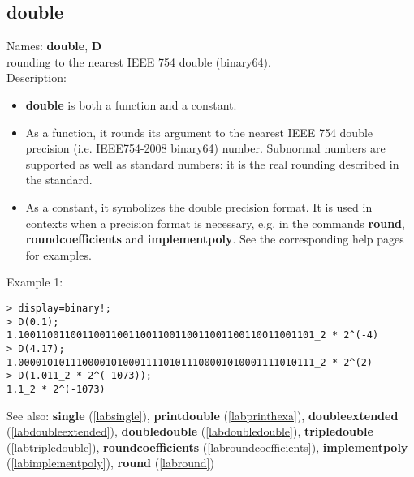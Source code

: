 \subsection{double}
\label{labdouble}
\noindent Names: \textbf{double}, \textbf{D}\\
rounding to the nearest IEEE 754 double (binary64).\\
\noindent Description: \begin{itemize}

\item \textbf{double} is both a function and a constant.

\item As a function, it rounds its argument to the nearest IEEE 754 double precision (i.e. IEEE754-2008 binary64) number.
   Subnormal numbers are supported as well as standard numbers: it is the real
   rounding described in the standard.

\item As a constant, it symbolizes the double precision format. It is used in 
   contexts when a precision format is necessary, e.g. in the commands 
   \textbf{round}, \textbf{roundcoefficients} and \textbf{implementpoly}.
   See the corresponding help pages for examples.
\end{itemize}
\noindent Example 1: 
\begin{center}\begin{minipage}{15cm}\begin{Verbatim}[frame=single]
> display=binary!;
> D(0.1);
1.100110011001100110011001100110011001100110011001101_2 * 2^(-4)
> D(4.17);
1.000010101110000101000111101011100001010001111010111_2 * 2^(2)
> D(1.011_2 * 2^(-1073));
1.1_2 * 2^(-1073)
\end{Verbatim}
\end{minipage}\end{center}
See also: \textbf{single} (\ref{labsingle}), \textbf{printdouble} (\ref{labprinthexa}), \textbf{doubleextended} (\ref{labdoubleextended}), \textbf{doubledouble} (\ref{labdoubledouble}), \textbf{tripledouble} (\ref{labtripledouble}), \textbf{roundcoefficients} (\ref{labroundcoefficients}), \textbf{implementpoly} (\ref{labimplementpoly}), \textbf{round} (\ref{labround})

